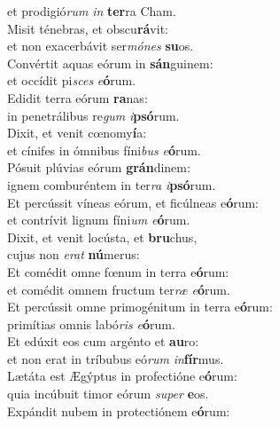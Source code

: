 \evenverse et prodigió\textit{rum} \textit{in} \textbf{ter}ra Cham.\\
\oddverse Misit ténebras, et obscu\textbf{rá}vit:~\*\\
\oddverse et non exacerbávit ser\textit{mó}\textit{nes} \textbf{su}os.\\
\evenverse Convértit aquas eórum in \textbf{sán}guinem:~\*\\
\evenverse et occídit pi\textit{sces} \textit{e}\textbf{ó}rum.\\
\oddverse Edidit terra eórum \textbf{ra}nas:~\*\\
\oddverse in penetrálibus re\textit{gum} \textit{i}\textbf{psó}rum.\\
\evenverse Dixit, et venit cœnomy\textbf{í}a:~\*\\
\evenverse et cínifes in ómnibus fíni\textit{bus} \textit{e}\textbf{ó}rum.\\
\oddverse Pósuit plúvias eórum \textbf{grán}dinem:~\*\\
\oddverse ignem comburéntem in ter\textit{ra} \textit{i}\textbf{psó}rum.\\
\evenverse Et percússit víneas eórum, et ficúlneas e\textbf{ó}rum:~\*\\
\evenverse et contrívit lignum fíni\textit{um} \textit{e}\textbf{ó}rum.\\
\oddverse Dixit, et venit locústa, et \textbf{bru}chus,~\*\\
\oddverse cujus non \textit{e}\textit{rat} \textbf{nú}merus:\\
\evenverse Et comédit omne fœnum in terra e\textbf{ó}rum:~\*\\
\evenverse et comédit omnem fructum ter\textit{ræ} \textit{e}\textbf{ó}rum.\\
\oddverse Et percússit omne primogénitum in terra e\textbf{ó}rum:~\*\\
\oddverse primítias omnis labó\textit{ris} \textit{e}\textbf{ó}rum.\\
\evenverse Et edúxit eos cum argénto et \textbf{au}ro:~\*\\
\evenverse et non erat in tríbubus eó\textit{rum} \textit{in}\textbf{fír}mus.\\
\oddverse Lætáta est Ægýptus in profectióne e\textbf{ó}rum:~\*\\
\oddverse quia incúbuit timor eórum \textit{su}\textit{per} \textbf{e}os.\\
\evenverse Expándit nubem in protectiónem e\textbf{ó}rum:~\*\\
